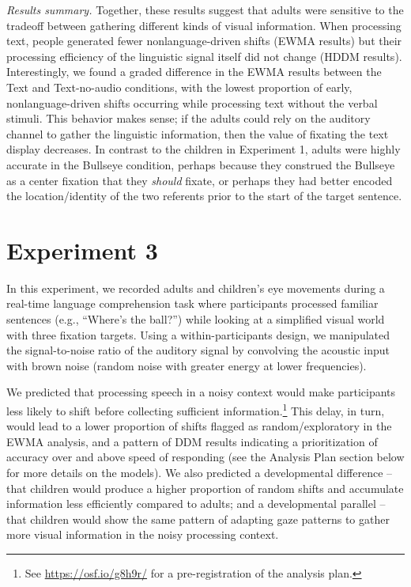 \documentclass[english,floatsintext,man]{apa6}
\begin{document}
\emph{Results summary.} Together, these results suggest that adults were
sensitive to the tradeoff between gathering different kinds of visual
information. When processing text, people generated fewer
nonlanguage-driven shifts (EWMA results) but their processing efficiency
of the linguistic signal itself did not change (HDDM results).
Interestingly, we found a graded difference in the EWMA results between
the Text and Text-no-audio conditions, with the lowest proportion of
early, nonlanguage-driven shifts occurring while processing text without
the verbal stimuli. This behavior makes sense; if the adults could rely
on the auditory channel to gather the linguistic information, then the
value of fixating the text display decreases. In contrast to the
children in Experiment 1, adults were highly accurate in the Bullseye
condition, perhaps because they construed the Bullseye as a center
fixation that they \emph{should} fixate, or perhaps they had better
encoded the location/identity of the two referents prior to the start of
the target sentence.

\hypertarget{experiment-3}{%
\section{Experiment 3}\label{experiment-3}}

In this experiment, we recorded adults and children's eye movements
during a real-time language comprehension task where participants
processed familiar sentences (e.g., \enquote{Where's the ball?}) while
looking at a simplified visual world with three fixation targets. Using
a within-participants design, we manipulated the signal-to-noise ratio
of the auditory signal by convolving the acoustic input with brown noise
(random noise with greater energy at lower frequencies).

We predicted that processing speech in a noisy context would make
participants less likely to shift before collecting sufficient
information.\footnote{See \url{https://osf.io/g8h9r/} for a
  pre-registration of the analysis plan.} This delay, in turn, would
lead to a lower proportion of shifts flagged as random/exploratory in
the EWMA analysis, and a pattern of DDM results indicating a
prioritization of accuracy over and above speed of responding (see the
Analysis Plan section below for more details on the models). We also
predicted a developmental difference -- that children would produce a
higher proportion of random shifts and accumulate information less
efficiently compared to adults; and a developmental parallel -- that
children would show the same pattern of adapting gaze patterns to gather
more visual information in the noisy processing context.
\end{document}
